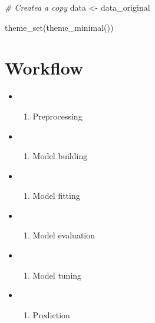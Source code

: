 \documentclass[
]{book}
\newenvironment{Shaded}{\begin{snugshade}}{\end{snugshade}}
\newcommand{\CommentTok}[1]{\textcolor[rgb]{0.56,0.35,0.01}{\textit{#1}}}
\newcommand{\FunctionTok}[1]{\textcolor[rgb]{0.00,0.00,0.00}{#1}}
\newcommand{\NormalTok}[1]{#1}
\newcommand{\OtherTok}[1]{\textcolor[rgb]{0.56,0.35,0.01}{#1}}
\providecommand{\tightlist}{%
  \setlength{\itemsep}{0pt}\setlength{\parskip}{0pt}}
\begin{document}
\begin{Shaded}
\begin{Highlighting}[]
\CommentTok{\# Createa a copy }
\NormalTok{data }\OtherTok{\textless{}{-}}\NormalTok{ data\_original}

\FunctionTok{theme\_set}\NormalTok{(}\FunctionTok{theme\_minimal}\NormalTok{())}
\end{Highlighting}
\end{Shaded}

\hypertarget{workflow-3}{%
\section{Workflow}\label{workflow-3}}

\begin{itemize}
\item
  \begin{enumerate}
  \def\labelenumi{\arabic{enumi}.}
  \tightlist
  \item
    Preprocessing
  \end{enumerate}
\item
  \begin{enumerate}
  \def\labelenumi{\arabic{enumi}.}
  \setcounter{enumi}{1}
  \tightlist
  \item
    Model building
  \end{enumerate}
\item
  \begin{enumerate}
  \def\labelenumi{\arabic{enumi}.}
  \setcounter{enumi}{2}
  \tightlist
  \item
    Model fitting
  \end{enumerate}
\item
  \begin{enumerate}
  \def\labelenumi{\arabic{enumi}.}
  \setcounter{enumi}{3}
  \tightlist
  \item
    Model evaluation
  \end{enumerate}
\item
  \begin{enumerate}
  \def\labelenumi{\arabic{enumi}.}
  \setcounter{enumi}{4}
  \tightlist
  \item
    Model tuning
  \end{enumerate}
\item
  \begin{enumerate}
  \def\labelenumi{\arabic{enumi}.}
  \setcounter{enumi}{5}
  \tightlist
  \item
    Prediction
  \end{enumerate}
\end{itemize}
\end{document}
